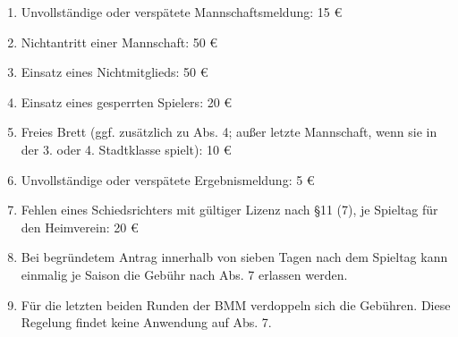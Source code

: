 \documentclass[fontsize=12pt, paper=a4, ngerman]{article}
\begin{document}
\begin{enumerate}
\item Unvollständige oder verspätete Mannschaftsmeldung: \hfill 15 €
\item Nichtantritt einer Mannschaft: \hfill 50 €
\item Einsatz eines Nichtmitglieds: \hfill 50 €
\item Einsatz eines gesperrten Spielers: \hfill 20 €
\item Freies Brett (ggf. zusätzlich zu Abs. 4; außer letzte Mannschaft, wenn sie in der 3. oder 4. Stadtklasse spielt): \hfill 10 €
\item Unvollständige oder verspätete Ergebnismeldung: \hfill 5 €
\item Fehlen eines Schiedsrichters mit gültiger Lizenz nach §11 (7), je Spieltag für den Heimverein: \hfill 20 € %
\item Bei begründetem Antrag innerhalb von sieben Tagen nach dem Spieltag kann einmalig je Saison die Gebühr nach Abs. 7 erlassen werden.
\item Für die letzten beiden Runden der BMM verdoppeln sich die Gebühren. Diese Regelung findet keine Anwendung auf Abs. 7.
\end{enumerate}
\end{document}
